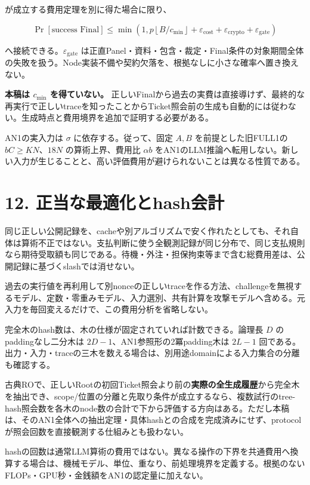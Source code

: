 \documentclass[
  10pt,
]{article}
\begin{document}
が成立する費用定理を別に得た場合に限り、

\[\Pr[\text{success Final}]\le\min\left(1,p\left\lfloor B/c_{\min}\right\rfloor+\varepsilon_{\mathrm{cost}}+\varepsilon_{\mathrm{crypto}}+\varepsilon_{\mathrm{gate}}\right)\]

へ接続できる。\(\varepsilon_{\mathrm{gate}}\)
は正直Panel・資料・包含・裁定・Final条件の対象期間全体の失敗を扱う。Node実装不備や契約欠落を、根拠なしに小さな確率へ置き換えない。

\textbf{本稿は \(c_{\min}\) を得ていない。}
正しいFinalから過去の実費は直接導けず、最終的な再実行で正しいtraceを知ったことからTicket照会前の生成も自動的には従わない。生成時点と費用境界を追加で証明する必要がある。

AN1の実入力は \(\sigma\) に依存する。従って、固定 \(A,B\)
を前提とした旧FULL1の \(bC\ge KN\)、\(18N\) の算術上界、費用比
\(\alpha b\)
をAN1のLLM推論へ転用しない。新しい入力が生じることと、高い評価費用が避けられないことは異なる性質である。

\section{12.
正当な最適化とhash会計}\label{ux6b63ux5f53ux306aux6700ux9069ux5316ux3068hashux4f1aux8a08}

同じ正しい公開記録を、cacheや別アルゴリズムで安く作れたとしても、それ自体は算術不正ではない。支払判断に使う全観測記録が同じ分布で、同じ支払規則なら期待受取額も同じである。待機・外注・担保拘束等まで含む総費用差は、公開記録に基づくslashでは消せない。

過去の実行値を再利用して別nonceの正しいtraceを作る方法、challengeを無視するモデル、定数・零重みモデル、入力選別、共有計算を攻撃モデルへ含める。元入力を毎回変えるだけで、この費用分析を省略しない。

完全木のhash数は、木の仕様が固定されていれば計数できる。論理長 \(D\)
のpaddingなし二分木は \(2D-1\)、AN1参照形の2冪padding木は \(2L-1\)
回である。出力・入力・traceの三木を数える場合は、別用途domainによる入力集合の分離も確認する。

古典ROで、正しいRootの初回Ticket照会より前の\textbf{実際の全生成履歴}から完全木を抽出でき、scope/位置の分離と先取り条件が成立するなら、複数試行のtree-hash照会数を各木のnode数の合計で下から評価する方向はある。ただし本稿は、そのAN1全体への抽出定理・具体hashとの合成を完成済みにせず、protocolが照会回数を直接観測する仕組みとも扱わない。

hashの回数は通常LLM算術の費用ではない。異なる操作の下界を共通費用へ換算する場合は、機械モデル、単位、重なり、前処理境界を定義する。根拠のないFLOPs・GPU秒・金銭額をAN1の認定量に加えない。
\end{document}
